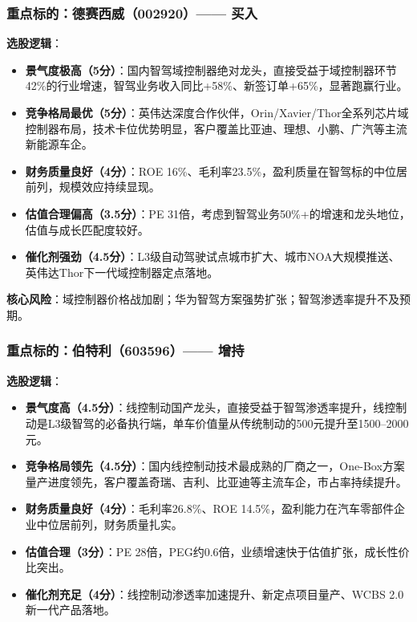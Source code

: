 \subsubsection*{重点标的：德赛西威（002920）—— 买入}

\textbf{选股逻辑}：
\vspace{0.2em}
\begin{itemize}[leftmargin=2em]
\item \textbf{景气度极高（5分）}：国内智驾域控制器绝对龙头，直接受益于域控制器环节42\%的行业增速，智驾业务收入同比+58\%、新签订单+65\%，显著跑赢行业。
\item \textbf{竞争格局最优（5分）}：英伟达深度合作伙伴，Orin/Xavier/Thor全系列芯片域控制器布局，技术卡位优势明显，客户覆盖比亚迪、理想、小鹏、广汽等主流新能源车企。
\item \textbf{财务质量良好（4分）}：ROE 16\%、毛利率23.5\%，盈利质量在智驾标的中位居前列，规模效应持续显现。
\item \textbf{估值合理偏高（3.5分）}：PE 31倍，考虑到智驾业务50\%+的增速和龙头地位，估值与成长匹配度较好。
\item \textbf{催化剂强劲（4.5分）}：L3级自动驾驶试点城市扩大、城市NOA大规模推送、英伟达Thor下一代域控制器定点落地。
\end{itemize}

\textbf{核心风险}：域控制器价格战加剧；华为智驾方案强势扩张；智驾渗透率提升不及预期。

\subsubsection*{重点标的：伯特利（603596）—— 增持}

\textbf{选股逻辑}：
\vspace{0.2em}
\begin{itemize}[leftmargin=2em]
\item \textbf{景气度高（4.5分）}：线控制动国产龙头，直接受益于智驾渗透率提升，线控制动是L3级智驾的必备执行端，单车价值量从传统制动的500元提升至1500--2000元。
\item \textbf{竞争格局领先（4.5分）}：国内线控制动技术最成熟的厂商之一，One-Box方案量产进度领先，客户覆盖奇瑞、吉利、比亚迪等主流车企，市占率持续提升。
\item \textbf{财务质量良好（4分）}：毛利率26.8\%、ROE 14.5\%，盈利能力在汽车零部件企业中位居前列，财务质量扎实。
\item \textbf{估值合理（3分）}：PE 28倍，PEG约0.6倍，业绩增速快于估值扩张，成长性价比突出。
\item \textbf{催化剂充足（4分）}：线控制动渗透率加速提升、新定点项目量产、WCBS 2.0新一代产品落地。
\end{itemize}

